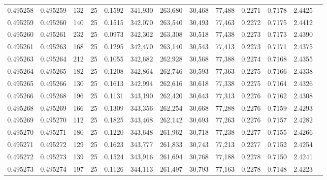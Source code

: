 \begin{tabular}{rrrrrrrrrrrrr}
0.495258 & 0.495259 &   132 &  25 &                                     0.1592 & 341,930 & 263,680 &  30,468 &  77,488 & 0.2271 & 0.7178 & 2.4425 \\
0.495259 & 0.495260 &   140 &  25 &                                     0.1515 & 342,070 & 263,540 &  30,493 &  77,463 & 0.2272 & 0.7175 & 2.4412 \\
0.495260 & 0.495261 &   232 &  25 &                                     0.0973 & 342,302 & 263,308 &  30,518 &  77,438 & 0.2273 & 0.7173 & 2.4390 \\
0.495261 & 0.495263 &   168 &  25 &                                     0.1295 & 342,470 & 263,140 &  30,543 &  77,413 & 0.2273 & 0.7171 & 2.4375 \\
0.495263 & 0.495264 &   212 &  25 &                                     0.1055 & 342,682 & 262,928 &  30,568 &  77,388 & 0.2274 & 0.7168 & 2.4355 \\
0.495264 & 0.495265 &   182 &  25 &                                     0.1208 & 342,864 & 262,746 &  30,593 &  77,363 & 0.2275 & 0.7166 & 2.4338 \\
0.495265 & 0.495266 &   130 &  25 &                                     0.1613 & 342,994 & 262,616 &  30,618 &  77,338 & 0.2275 & 0.7164 & 2.4326 \\
0.495266 & 0.495268 &   196 &  25 &                                     0.1131 & 343,190 & 262,420 &  30,643 &  77,313 & 0.2276 & 0.7162 & 2.4308 \\
0.495268 & 0.495269 &   166 &  25 &                                     0.1309 & 343,356 & 262,254 &  30,668 &  77,288 & 0.2276 & 0.7159 & 2.4293 \\
0.495269 & 0.495270 &   112 &  25 &                                     0.1825 & 343,468 & 262,142 &  30,693 &  77,263 & 0.2276 & 0.7157 & 2.4282 \\
0.495270 & 0.495271 &   180 &  25 &                                     0.1220 & 343,648 & 261,962 &  30,718 &  77,238 & 0.2277 & 0.7155 & 2.4266 \\
0.495271 & 0.495272 &   129 &  25 &                                     0.1623 & 343,777 & 261,833 &  30,743 &  77,213 & 0.2277 & 0.7152 & 2.4254 \\
0.495272 & 0.495273 &   139 &  25 &                                     0.1524 & 343,916 & 261,694 &  30,768 &  77,188 & 0.2278 & 0.7150 & 2.4241 \\
0.495273 & 0.495274 &   197 &  25 &                                     0.1126 & 344,113 & 261,497 &  30,793 &  77,163 & 0.2278 & 0.7148 & 2.4223 \\

\end{tabular}
